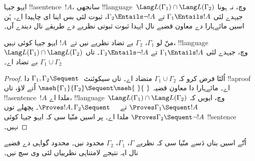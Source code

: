\documentclass[../../../include/open-logic-section]{subfiles}
\begin{document}
ایہو جیہا !!a{sentence}~$!A$، سانجھی !!{language}~$\Lang L(\Gamma_1) \cap \Lang L(\Gamma_2)$ وچ، نہ ہونا جیہدے لئی $\Gamma_1
\Entails !A$ تے $\Gamma_2 \Entails \lnot !A$، ثبوت لئی بس اینا ای چاہیدا اے۔ ہُن اسیں مائےہارا دے معاون قضیے نال ایہدا ثبوت ثبوتی نظریے دے طریقے نال دیندے آں۔

\begin{thm}
منّ لو $\Gamma_1$، $\Gamma_2$ بے تضاد نظریے نیں تے~$!A$ ایہو جیہا کوئی نہیں، !!{language} $\Lang L(\Gamma_1) \cap \Lang L(\Gamma_2)$ وچ، جیہدے لئی $\Gamma_1 \Entails !A$ تے $\Gamma_2 \Entails \lnot !A$۔ تاں $\Gamma_1 \cup \Gamma_2$ بے تضاد اے۔
\end{thm}

\begin{proof}
اُلٹا فرض کرو کہ $\Gamma_1 \cup \Gamma_2$ متضاد اے۔ تاں سیکوئنٹ $\Gamma_1, \Gamma_2 \Sequent \ $ دا !!a{proof} اے۔ مائےہارا دا معاون قضیہ $\maeh{\Gamma_1}{\Gamma_2}
  \Sequent \maeh{\ }{\ }$ اُتے لاؤ، تاں !!a{sentence}~$!A$ ملدا اے، !!{language}~$\Lang L(\Gamma_1) \cap \Lang L(\Gamma_2)$ وچ، ایویں کہ $\Proves \Gamma_1 \Sequent !A$ تے $\Proves !A, \Gamma_2 \Sequent
  \quad$۔ پچھلے توں $\Proves \Gamma_2 \Sequent \lnot !A$ ملدا اے۔ پر اسیں منّیا سی کہ ایہو جیہا کوئی !!{sentence} نہیں۔
\end{proof}

اُتّے اسیں بناں دَسے منّیا سی کہ نظریے $\Gamma$، $\Gamma_1$، $\Gamma_2$ محدود نیں۔ محدود گواہی دے قضیے نال ایہ نتیجے لامتناہی نظرییاں لئی وی سچ نیں۔
\end{document}

